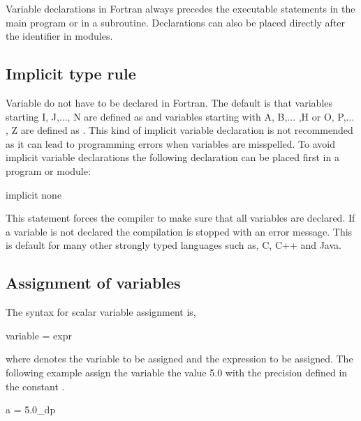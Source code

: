 Variable declarations in Fortran always precedes the executable statements in the main program or in a subroutine. Declarations can also be placed directly after the  identifier in modules.

\subsection{Implicit type rule}

Variable do not have to be declared in Fortran. The default is that variables starting I, J,..., N are defined as  and variables starting with A, B,... ,H or O, P,... , Z are defined as . This kind of implicit variable declaration is not recommended as it can lead to programming errors when variables are misspelled. To avoid implicit variable declarations the following declaration can be placed first in a program or module:

\fmode

\begin{fortrancodeenv}
implicit none
\end{fortrancodeenv}

This statement forces the compiler to make sure that all variables are declared. If a variable is not declared the compilation is stopped with an error message. This is default for many other strongly typed languages such as, C, C++ and Java.

\subsection{Assignment of variables}

The syntax for scalar variable assignment is,

\begin{fsyntax}
variable = expr
\end{fsyntax}

where  denotes the variable to be assigned and  the expression to be assigned. The following example assign the  variable the value 5.0 with the precision defined in the constant .

\begin{fortrancodeenv}
a = 5.0_dp
\end{fortrancodeenv}

